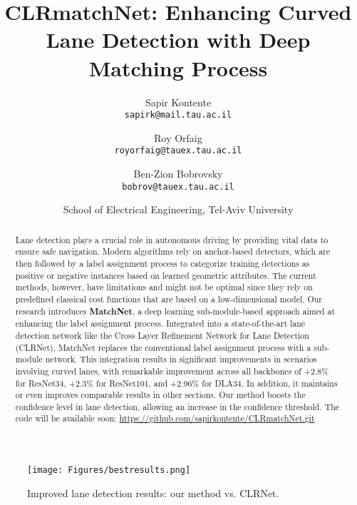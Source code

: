 \documentclass[10pt,twocolumn,letterpaper]{article}
\begin{document}
\title{CLRmatchNet: Enhancing Curved Lane Detection with Deep Matching Process}

\author{Sapir Kontente\\
{\tt\small sapirk@mail.tau.ac.il}
\and
Roy Orfaig\\
{\tt\small royorfaig@tauex.tau.ac.il}
\and 
Ben-Zion Bobrovsky \\
{\tt\small bobrov@tauex.tau.ac.il}\\
\and
{School of Electrical Engineering, Tel-Aviv University}
}

\maketitle



\begin{abstract}
Lane detection plays a crucial role in autonomous driving by providing vital data to ensure safe navigation. Modern algorithms rely on anchor-based detectors, which are then followed by a label assignment process to categorize training detections as positive or negative instances based on learned geometric attributes. 
The current methods, however, have limitations and might not be optimal since they rely on predefined classical cost functions that are based on a low-dimensional model. Our research introduces \textbf{MatchNet}, a deep learning sub-module-based approach aimed at enhancing the label assignment process. Integrated into a state-of-the-art lane detection network like the Cross Layer Refinement Network for Lane Detection (CLRNet), MatchNet replaces the conventional label assignment process with a sub-module network. This integration results in significant improvements in scenarios involving curved lanes, with remarkable improvement across all backbones of +2.8\% for ResNet34, +2.3\% for ResNet101, and +2.96\% for DLA34. In addition, it maintains or even improves comparable results in other sections. Our method boosts the confidence level in lane detection, allowing an increase in the confidence threshold. The code will be available soon: \href{https://github.com/sapirkontente/CLRmatchNet.git}{https://github.com/sapirkontente/CLRmatchNet.git}
\end{abstract}


\begin{figure}[t]
\begin{center}
   \texttt{[image: Figures/bestresults.png]}
   \caption{Improved lane detection results: our method vs. CLRNet.}
\label{bestresult}
\end{center}
\end{figure}
\end{document}
